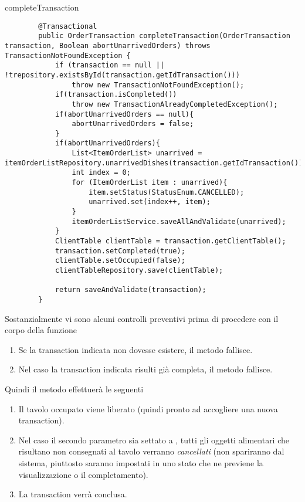 \begin{elsrc}{completeTransaction}
	\begin{verbatim}
		@Transactional
		public OrderTransaction completeTransaction(OrderTransaction transaction, Boolean abortUnarrivedOrders) throws TransactionNotFoundException {
			if (transaction == null || !trepository.existsById(transaction.getIdTransaction()))
				throw new TransactionNotFoundException();
			if(transaction.isCompleted())
				throw new TransactionAlreadyCompletedException();
			if(abortUnarrivedOrders == null){
				abortUnarrivedOrders = false;
			}
			if(abortUnarrivedOrders){
				List<ItemOrderList> unarrived = itemOrderListRepository.unarrivedDishes(transaction.getIdTransaction());
				int index = 0;
				for (ItemOrderList item : unarrived){
					item.setStatus(StatusEnum.CANCELLED);
					unarrived.set(index++, item);
				}
				itemOrderListService.saveAllAndValidate(unarrived);
			}
			ClientTable clientTable = transaction.getClientTable();
			transaction.setCompleted(true);
			clientTable.setOccupied(false);
			clientTableRepository.save(clientTable);

			return saveAndValidate(transaction);
		}
	\end{verbatim}
\end{elsrc}

Sostanzialmente vi sono alcuni controlli preventivi prima di procedere con il corpo della funzione
\begin{enumerate}
	\item Se la transaction indicata non dovesse esistere, il metodo fallisce.
	\item Nel caso la transaction indicata risulti già completa, il metodo fallisce.
\end{enumerate}

Quindi il metodo effettuerà le seguenti
\begin{enumerate}
	\item Il tavolo occupato viene liberato (quindi pronto ad accogliere una nuova transaction).
	\item Nel caso il secondo parametro  sia settato a , tutti gli oggetti alimentari che 
		risultano non consegnati al tavolo verranno \textit{cancellati} (non spariranno dal sistema, piuttosto saranno impostati in uno stato che ne previene la visualizzazione o il completamento).
	\item La transaction verrà conclusa.
\end{enumerate}

